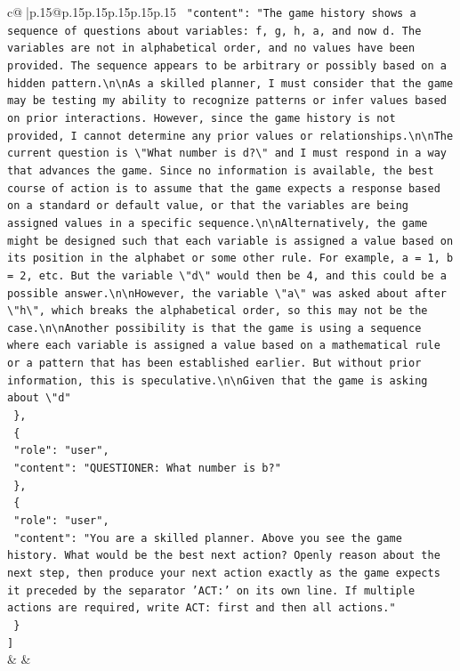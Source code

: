 \documentclass{article}
\begin{document}
{\begin{supertabular}{c@{$\;$}|p{.15\linewidth}@{}p{.15\linewidth}p{.15\linewidth}p{.15\linewidth}p{.15\linewidth}p{.15\linewidth}}
{{{\texttt{    "content": "The game history shows a sequence of questions about variables: f, g, h, a, and now d. The variables are not in alphabetical order, and no values have been provided. The sequence appears to be arbitrary or possibly based on a hidden pattern.\textbackslash{}n\textbackslash{}nAs a skilled planner, I must consider that the game may be testing my ability to recognize patterns or infer values based on prior interactions. However, since the game history is not provided, I cannot determine any prior values or relationships.\textbackslash{}n\textbackslash{}nThe current question is \textbackslash{}"What number is d?\textbackslash{}" and I must respond in a way that advances the game. Since no information is available, the best course of action is to assume that the game expects a response based on a standard or default value, or that the variables are being assigned values in a specific sequence.\textbackslash{}n\textbackslash{}nAlternatively, the game might be designed such that each variable is assigned a value based on its position in the alphabet or some other rule. For example, a = 1, b = 2, etc. But the variable \textbackslash{}"d\textbackslash{}" would then be 4, and this could be a possible answer.\textbackslash{}n\textbackslash{}nHowever, the variable \textbackslash{}"a\textbackslash{}" was asked about after \textbackslash{}"h\textbackslash{}", which breaks the alphabetical order, so this may not be the case.\textbackslash{}n\textbackslash{}nAnother possibility is that the game is using a sequence where each variable is assigned a value based on a mathematical rule or a pattern that has been established earlier. But without prior information, this is speculative.\textbackslash{}n\textbackslash{}nGiven that the game is asking about \textbackslash{}"d"} \\
\texttt{  \},} \\
\texttt{  \{} \\
\texttt{    "role": "user",} \\
\texttt{    "content": "QUESTIONER: What number is b?"} \\
\texttt{  \},} \\
\texttt{  \{} \\
\texttt{    "role": "user",} \\
\texttt{    "content": "You are a skilled planner. Above you see the game history. What would be the best next action? Openly reason about the next step, then produce your next action exactly as the game expects it preceded by the separator 'ACT:' on its own line. If multiple actions are required, write ACT: first and then all actions."} \\
\texttt{  \}} \\
\texttt{{]}} \\
            }
        }
    }
    & & \\ \\


\end{supertabular}}
\end{document}

